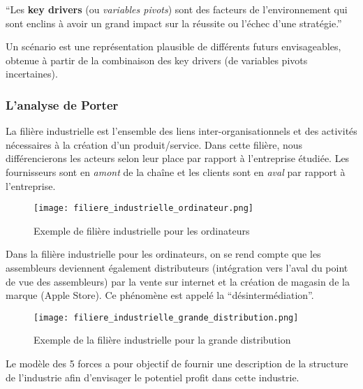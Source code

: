    \begin{multicols}{2}
    
    \enquote{Les \textbf{key drivers} (ou \textit{variables pivots})
    sont des facteurs de l'environnement qui sont enclins à avoir un
grand impact sur la réussite ou l'échec d'une stratégie.}
    \bigskip
    
    Un scénario est une représentation plausible de différents futurs envisageables, obtenue à partir de la combinaison des key drivers (de variables pivots incertaines).
    
   \end{multicols}
   
   \subsubsection{L'analyse de Porter}
   
   La filière industrielle est l'ensemble des liens inter-organisationnels et des activités nécessaires à la création d'un produit/service. Dans cette filière, nous différencierons les acteurs selon leur place par rapport à l'entreprise étudiée. Les fournisseurs sont en \textit{amont} de la chaîne et les clients sont en \textit{aval} par rapport à l'entreprise.
   
   \begin{figure}[H]
      \begin{center}
	\texttt{[image: filiere\_industrielle\_ordinateur.png]}
	\caption{Exemple de filière industrielle pour les ordinateurs}
      \end{center}
   \end{figure}
   
   Dans la filière industrielle pour les ordinateurs, on se rend compte
   que les assembleurs deviennent également distributeurs (intégration
   vers l'aval du point de vue des assembleurs) par la vente sur
   internet et la création de magasin de la marque (Apple Store). Ce
   phénomène est appelé la \enquote{désintermédiation}.
   
   \begin{figure}[H]
      \begin{center}
	\texttt{[image: filiere\_industrielle\_grande\_distribution.png]}
	\caption{Exemple de la filière industrielle pour la grande distribution}
      \end{center}
   \end{figure}
   
   Le modèle des 5 forces a pour objectif de fournir une description de la structure de l'industrie afin d'envisager le potentiel profit dans cette industrie.
   

